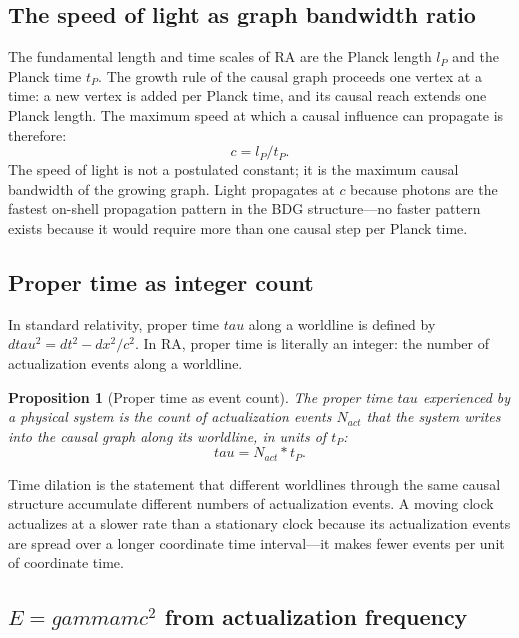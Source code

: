 \documentclass[11pt]{article}
\def\ell{l}%
\def\gamma{gamma}%
\def\tau{tau}%
\def\mathrm#1{#1}%
\def\frac#1#2{#1/#2}%
\def\cdot{*}%
\newtheorem{proposition}{Proposition}
\begin{document}
\subsection{The speed of light as graph bandwidth ratio}

The fundamental length and time scales of RA are the Planck length $\ell_P$ and the Planck time $t_P$. The growth rule of the causal graph proceeds one vertex at a time: a new vertex is added per Planck time, and its causal reach extends one Planck length. The maximum speed at which a causal influence can propagate is therefore:
\begin{equation}
\label{eq:c_bandwidth}
\boxed{c = \frac{\ell_P}{t_P}.}
\end{equation}
The speed of light is not a postulated constant; it is the maximum causal bandwidth of the growing graph. Light propagates at $c$ because photons are the fastest on-shell propagation pattern in the BDG structure---no faster pattern exists because it would require more than one causal step per Planck time.

\subsection{Proper time as integer count}

In standard relativity, proper time $\tau$ along a worldline is defined by $d\tau^2 = dt^2 - dx^2/c^2$. In RA, proper time is literally an integer: the number of actualization events along a worldline.

\begin{proposition}[Proper time as event count]
\label{prop:proper_time}
The proper time $\tau$ experienced by a physical system is the count of actualization events $N_{\mathrm{act}}$ that the system writes into the causal graph along its worldline, in units of $t_P$:
\begin{equation}
\tau = N_{\mathrm{act}} \cdot t_P.
\end{equation}
\end{proposition}

Time dilation is the statement that different worldlines through the same causal structure accumulate different numbers of actualization events. A moving clock actualizes at a slower rate than a stationary clock because its actualization events are spread over a longer coordinate time interval---it makes fewer events per unit of coordinate time.

\subsection{$E = \gamma m c^2$ from actualization frequency}
\end{document}
